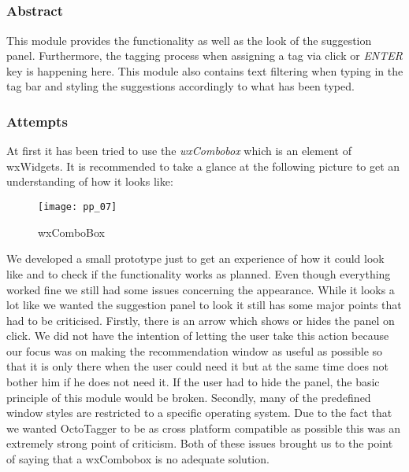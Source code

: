 \subsection{}
\label{sub:mod:autocomplete}
\def\kapitelautor{Christoph Führer}

\subsubsection{Abstract}

This module provides the functionality as well as the look of the suggestion panel. Furthermore, the tagging process when assigning a tag via click or \textit{ENTER} key is happening here. This module also contains text filtering when typing in the tag bar and styling the suggestions accordingly to what has been typed.

\subsubsection{Attempts}

At first it has been tried to use the \textit{wxCombobox} which is an element of wxWidgets. It is recommended to take a glance at the following picture to get an understanding of how it looks like:

\begin{figure}[H]
    \centering
    \texttt{[image: pp\_07]}
    \caption{wxComboBox}
\end{figure}

We developed a small prototype just to get an experience of how it could look like and to check if the functionality works as planned. Even though everything worked fine we still had some issues concerning the appearance.
While it looks a lot like we wanted the suggestion panel to look it still has some major points that had to be criticised. Firstly, there is an arrow which shows or hides the panel on click. We did not have the intention of letting the user take this action because our focus was on making the recommendation window as useful as possible so that it is only there when the user could need it but at the same time does not bother him if he does not need it. If the user had to hide the panel, the basic principle of this module would be broken. Secondly, many of the predefined window styles are restricted to a specific operating system. Due to the fact that we wanted OctoTagger to be as cross platform compatible as possible this was an extremely strong point of criticism. Both of these issues brought us to the point of saying that a wxCombobox is no adequate solution.

